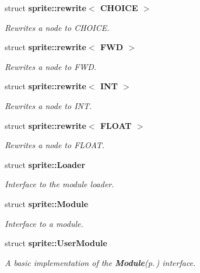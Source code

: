 \begin{CompactItemize}
struct {\bf sprite::rewrite$<$ CHOICE $>$}
\begin{CompactList}\small\item\em Rewrites a node to CHOICE. \item\end{CompactList}\item 
struct {\bf sprite::rewrite$<$ FWD $>$}
\begin{CompactList}\small\item\em Rewrites a node to FWD. \item\end{CompactList}\item 
struct {\bf sprite::rewrite$<$ INT $>$}
\begin{CompactList}\small\item\em Rewrites a node to INT. \item\end{CompactList}\item 
struct {\bf sprite::rewrite$<$ FLOAT $>$}
\begin{CompactList}\small\item\em Rewrites a node to FLOAT. \item\end{CompactList}\item 
struct {\bf sprite::Loader}
\begin{CompactList}\small\item\em Interface to the module loader. \item\end{CompactList}\item 
struct {\bf sprite::Module}
\begin{CompactList}\small\item\em Interface to a module. \item\end{CompactList}\item 
struct {\bf sprite::User\-Module}
\begin{CompactList}\small\item\em A basic implementation of the {\bf Module}{\rm (p.\,\pageref{structsprite_1_1Module})} interface. \item\end{CompactList}\end{CompactItemize}

